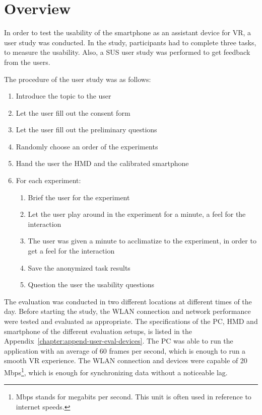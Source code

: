 \section{Overview}\label{section:evaluation-overview}
In order to test the usability of the smartphone as an assistant device for \gls{VR}, a user study was conducted. In the study, participants had to complete three tasks, to measure the usability. Also, a \gls{SUS} user study was performed to get feedback from the users.

The procedure of the user study was as follows:
\begin{enumerate}
  \item Introduce the topic to the user
  \item Let the user fill out the consent form
  \item Let the user fill out the preliminary questions
  \item Randomly choose an order of the experiments
  \item Hand the user the \gls{HMD} and the calibrated smartphone
  \item For each experiment:
  \begin{enumerate}
    \item Brief the user for the experiment
    \item Let the user play around in the experiment for a minute, a feel for the interaction
    \item The user was given a minute to acclimatize to the experiment, in order to get a feel for the interaction
    \item Save the anonymized task results
    \item Question the user the usability questions
  \end{enumerate}
\end{enumerate}

The evaluation was conducted in two different locations at different times of the day. Before starting the study, the \gls{WLAN} connection and network performance were tested and evaluated as appropriate. The specifications of the \gls{PC}, \gls{HMD} and smartphone of the different evaluation setups, is listed in the Appendix~\ref{chapter:append-user-eval-devices}. The \gls{PC} was able to run the application with an average of 60 frames per second, which is enough to run a smooth \gls{VR} experience. The \gls{WLAN} connection and devices were capable of 20 Mbps\footnote{Mbps stands for megabits per second. This unit is often used in reference to internet speeds.}, which is enough for synchronizing data without a noticeable lag.

